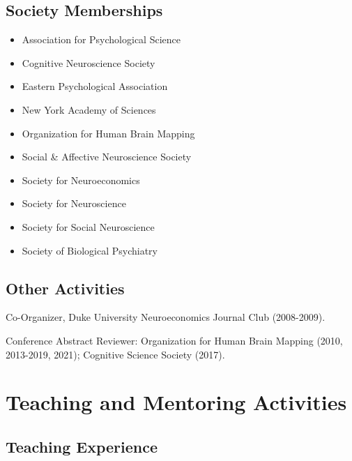\documentclass[11pt, letterpaper]{article}
\begin{document}
\subsection*{Society Memberships}
\begin{multicols}{2}
\begin{itemize}[noitemsep]
\item Association for Psychological Science
\item Cognitive Neuroscience Society
\item Eastern Psychological Association
\item New York Academy of Sciences
\item Organization for Human Brain Mapping
\item Social \& Affective Neuroscience Society
\item Society for Neuroeconomics
\item Society for Neuroscience
\item Society for Social Neuroscience
\item Society of Biological Psychiatry
\end{itemize}
\end{multicols}

\subsection*{Other Activities}
\begin{hangparas}{.5in}{1}
Co-Organizer, Duke University Neuroeconomics Journal Club (2008-2009).

Conference Abstract Reviewer: Organization for Human Brain Mapping (2010, 2013-2019, 2021); Cognitive Science Society (2017). \\

\end{hangparas}


\pagebreak
\vspace{.2cm}
\section*{Teaching and Mentoring Activities}
\subsection*{Teaching Experience}
\end{document}
